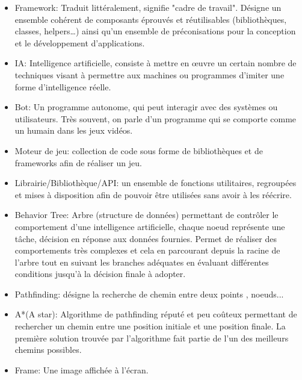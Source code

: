 \documentclass[french]{article}
\begin{document}
\begin{itemize}
    \item Framework: Traduit littéralement, signifie "cadre de travail". Désigne un ensemble cohérent de composants éprouvés et réutilisables (bibliothèques, classes, helpers…) ainsi qu'un ensemble de préconisations pour la conception et le développement d'applications.
    \newline
    \item IA: Intelligence artificielle, consiste à mettre en œuvre un certain nombre de techniques visant à permettre aux machines ou programmes d'imiter une forme d'intelligence réelle.
    \newline
    \item Bot: Un programme autonome, qui peut interagir avec des systèmes ou utilisateurs. Très souvent, on parle d'un programme qui se comporte comme un humain dans les jeux vidéos.
    \newline
    \item Moteur de jeu: collection de code sous forme de bibliothèques et de frameworks afin de réaliser un jeu.
    \newline
    \item Librairie/Bibliothèque/API: un ensemble de fonctions utilitaires, regroupées et mises à disposition afin de pouvoir être utilisées sans avoir à les réécrire.
    \newline
    \item Behavior Tree: Arbre (structure de données) permettant de contrôler le comportement d'une intelligence artificielle, chaque noeud représente une tâche, décision en réponse aux données fournies. Permet de réaliser des comportements très complexes et cela en parcourant depuis la racine de l'arbre tout en suivant les branches adéquates en évaluant différentes conditions jusqu'à la décision finale à adopter.
    \newline
    \item Pathfinding: désigne la recherche de chemin entre deux points , noeuds...
    \newline
    \item A*(A star): Algorithme de pathfinding réputé et peu coûteux permettant de rechercher un chemin entre une position initiale et une position finale. La première solution trouvée par l'algorithme fait partie de l'un des meilleurs chemins possibles.
    \newline
    
    \item Frame: Une image affichée à l'écran.\newline
    

\end{itemize}
\end{document}
